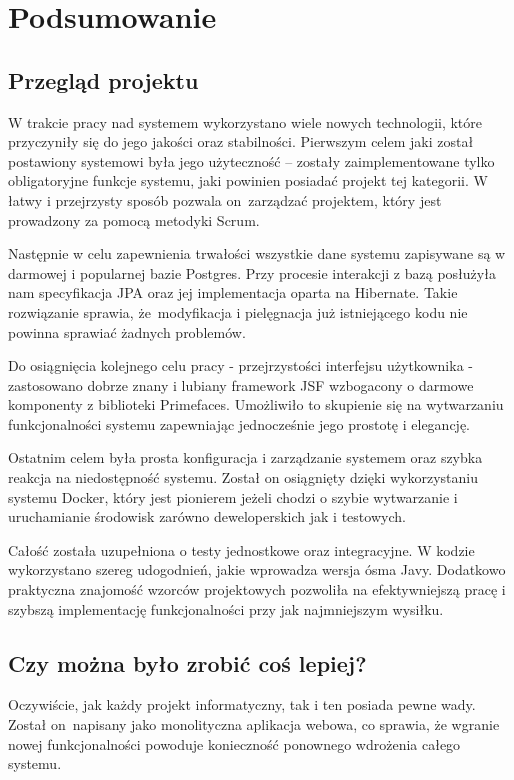 \chapter{Podsumowanie}

\section{Przegląd projektu}
W trakcie pracy nad systemem wykorzystano wiele nowych technologii, które przyczyniły się do jego jakości oraz stabilności. Pierwszym celem jaki został postawiony systemowi była jego użyteczność -- zostały zaimplementowane tylko obligatoryjne funkcje systemu, jaki powinien posiadać projekt tej kategorii. W łatwy i przejrzysty sposób pozwala on~zarządzać projektem, który jest prowadzony za pomocą metodyki Scrum. 

Następnie w celu zapewnienia trwałości wszystkie dane systemu zapisywane są w darmowej i popularnej bazie Postgres. Przy procesie interakcji z bazą posłużyła nam specyfikacja JPA oraz jej implementacja oparta na Hibernate. Takie rozwiązanie sprawia, że~modyfikacja i pielęgnacja już istniejącego kodu nie powinna sprawiać żadnych problemów.

Do osiągnięcia kolejnego celu pracy - przejrzystości interfejsu użytkownika - zastosowano dobrze znany i lubiany framework JSF wzbogacony o darmowe komponenty z biblioteki Primefaces. Umożliwiło to skupienie się na wytwarzaniu funkcjonalności systemu zapewniając jednocześnie jego prostotę i elegancję.

Ostatnim celem była prosta konfiguracja i zarządzanie systemem oraz szybka reakcja na niedostępność systemu. Został on osiągnięty dzięki wykorzystaniu systemu Docker, który jest pionierem jeżeli chodzi o szybie wytwarzanie i uruchamianie środowisk zarówno deweloperskich jak i testowych. 

Całość została uzupełniona o testy jednostkowe oraz integracyjne. W kodzie wykorzystano szereg udogodnień, jakie wprowadza wersja ósma Javy. Dodatkowo praktyczna znajomość wzorców projektowych pozwoliła na efektywniejszą pracę i szybszą implementację funkcjonalności przy jak najmniejszym wysiłku.


\section{Czy można było zrobić coś lepiej?}
Oczywiście, jak każdy projekt informatyczny, tak i ten posiada pewne wady. Został on~napisany jako monolityczna aplikacja webowa, co sprawia, że wgranie nowej funkcjonalności powoduje konieczność ponownego wdrożenia całego systemu.

